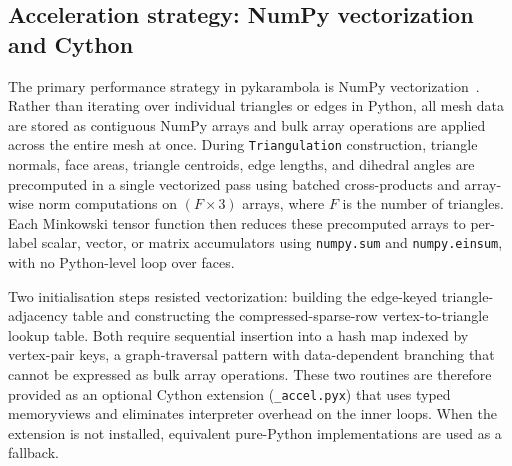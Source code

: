 \documentclass[times, twoside, watermark]{zHenriquesLab-StyleBioRxiv}
\begin{document}
\subsection*{Acceleration strategy: NumPy vectorization and Cython}
The primary performance strategy in pykarambola is NumPy vectorization~\cite{harris2020numpy}.
Rather than iterating over individual triangles or edges in Python, all mesh data are stored as contiguous NumPy arrays and bulk array operations are applied across the entire mesh at once.
During \texttt{Triangulation} construction, triangle normals, face areas, triangle centroids, edge lengths, and dihedral angles are precomputed in a single vectorized pass using batched cross-products and array-wise norm computations on $(F \times 3)$ arrays, where $F$ is the number of triangles.
Each Minkowski tensor function then reduces these precomputed arrays to per-label scalar, vector, or matrix accumulators using \texttt{numpy.sum} and \texttt{numpy.einsum}, with no Python-level loop over faces.

Two initialisation steps resisted vectorization: building the edge-keyed triangle-adjacency table and constructing the compressed-sparse-row vertex-to-triangle lookup table.
Both require sequential insertion into a hash map indexed by vertex-pair keys, a graph-traversal pattern with data-dependent branching that cannot be expressed as bulk array operations.
These two routines are therefore provided as an optional Cython extension (\texttt{\_accel.pyx}) that uses typed memoryviews and eliminates interpreter overhead on the inner loops.
When the extension is not installed, equivalent pure-Python implementations are used as a fallback.
\end{document}
